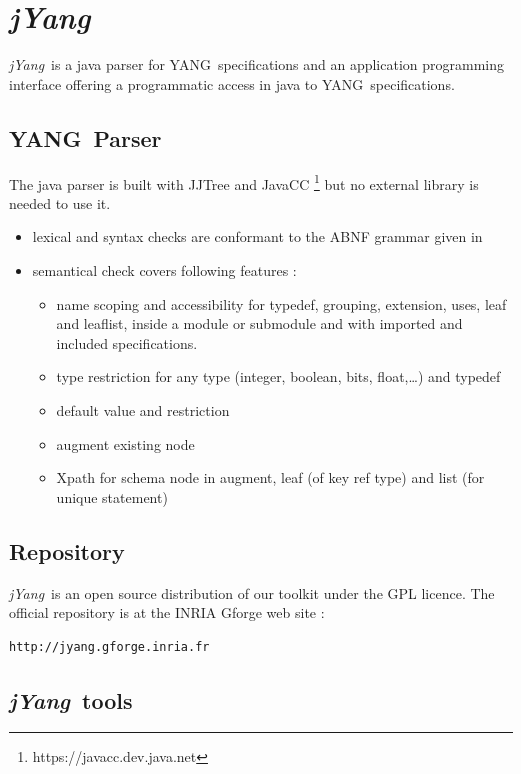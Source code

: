 \documentclass[a4paper]{article}
\newcommand{\jyang}{{\sl jYang}}
\newcommand{\y}{YANG}
\begin{document}
\section{\jyang}

\jyang\ is  a java  parser for \y\  specifications and  an application
programming interface  offering a programmatic  access in java  to \y\
specifications.

\subsection{\y\ Parser}

The    java    parser    is    built   with    JJTree    and    JavaCC
\footnote{https://javacc.dev.java.net}  but  no  external  library  is
needed to use it.

\begin{itemize}
\item
lexical and syntax  checks are conformant to the  ABNF grammar given in
\cite{yang01}
\item
semantical check covers following features :
\begin{itemize}
\item
name scoping and accessibility for typedef, grouping, extension, uses,
leaf and  leaflist, inside  a module  or submodule  and with  imported and
included specifications.
\item
type restriction  for any type (integer,  boolean, bits, float,\ldots)
and typedef
\item
default value and restriction
\item
augment existing node
\item
Xpath for schema node in augment, leaf (of key ref type) and list (for
unique statement)
\end{itemize}
\end{itemize}

\subsection{Repository}

\jyang\ is  an open source distribution  of our toolkit  under the GPL
licence. The official repository is at the INRIA Gforge web site :\\
\begin{verbatim}
http://jyang.gforge.inria.fr
\end{verbatim}

\subsection{\jyang\ tools}
\end{document}
